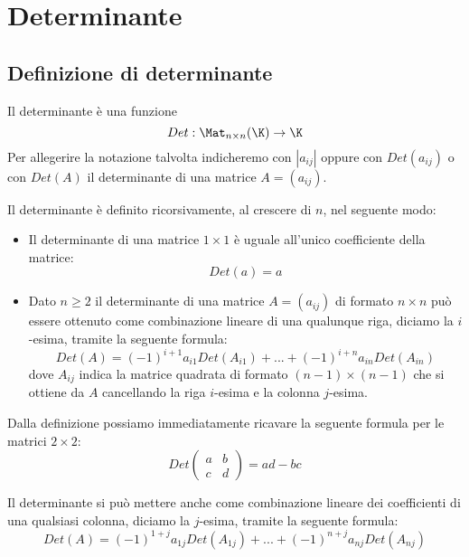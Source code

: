 \chapter{Determinante}
\section{Definizione di determinante}
Il determinante è una funzione
\[
	Det : \Mat_{n \times n}(\K) \to \K
\]
Per allegerire la notazione talvolta indicheremo con $|a_{ij}|$ oppure con
$Det(a_{ij})$ o con $Det(A)$ il determinante di una matrice $A = (a_{ij})$.

Il determinante è definito ricorsivamente, al crescere di $n$, nel seguente
modo:
\begin{itemize}
	\item Il determinante di una matrice $1 \times 1$ è uguale all'unico
	      coefficiente della matrice:
	      \[
		      Det(a) = a
	      \]
	\item Dato $n \geq 2$ il determinante di una matrice $A = (a_{ij})$ di
	      formato $n \times n$ può essere ottenuto come combinazione lineare
	      di una qualunque riga, diciamo la $i$-esima, tramite la seguente
	      formula:
	      \[
		      Det(A) = (-1)^{i + 1}a_{i1}Det(A_{i1}) + ... +
		      (-1)^{i + n}a_{in}Det(A_{in})
	      \]
	      dove $A_{ij}$ indica la matrice quadrata di formato
	      $(n - 1) \times (n - 1)$ che si ottiene da $A$ cancellando la riga
	      $i$-esima e la colonna $j$-esima.
\end{itemize}

\begin{observation}
	Dalla definizione possiamo immediatamente ricavare la seguente formula
	per le matrici $2 \times 2$:
	\[
		Det \begin{pmatrix}
			a & b \\
			c & d
		\end{pmatrix} =
		ad - bc
	\]
\end{observation}

\begin{observation}
	Il determinante si può mettere anche come combinazione lineare dei
	coefficienti di una qualsiasi colonna, diciamo la $j$-esima, tramite
	la seguente formula:
	\[
		Det(A) = (-1)^{1 + j}a_{1j}Det(A_{1j}) + ... +
		(-1)^{n + j}a_{nj}Det(A_{nj})
	\]
\end{observation}

